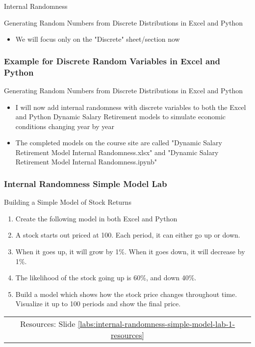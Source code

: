 \documentclass[handout, 11pt]{beamer}
\begin{document}
\begin{section}{Internal Randomness}
\begin{frame}
{\begin{block}{Generating Random Numbers from Discrete Distributions in Excel and Python}
\begin{itemize}
\item We will focus only on the "Discrete" sheet/section now
\end{itemize}
\end{block}
}
\end{frame}
\begin{frame}
\frametitle{Example for Discrete Random Variables in Excel and Python}
{
\begin{block}{Generating Random Numbers from Discrete Distributions in Excel and Python}
\begin{itemize}
\item I will now add internal randomness with discrete variables to both the Excel and Python Dynamic Salary Retirement models to simulate economic conditions changing year by year
\item The completed models on the course site are called "Dynamic Salary Retirement Model Internal Randomness.xlsx" and "Dynamic Salary Retirement Model Internal Randomness.ipynb"
\end{itemize}
\end{block}
}
\end{frame}
\begin{frame}
\frametitle{Internal Randomness Simple Model Lab}
{
\begin{block}{Building a Simple Model of Stock Returns}
\begin{enumerate}
\item Create the following model in both Excel and Python
\item A stock starts out priced at 100. Each period, it can either go up or down.
\item When it goes up, it will grow by 1\%. When it goes down, it will decrease by 1\%.
\item The likelihood of the stock going up is 60\%, and down 40\%.
\item Build a model which shows how the stock price changes throughout time. Visualize it up to 100 periods and show the final price.
\end{enumerate}
\vfill
\begin{tabular*}{\textwidth}{@{\extracolsep{\fill}}ccc}
\toprule
\hfill & Resources: Slide \textcolor{blue}{\underline{\ref{labs:internal-randomness-simple-model-lab-1-resources}}} & \hfill\\


\end{tabular*}
\end{block}}
\end{frame}
\end{section}
\end{document}
